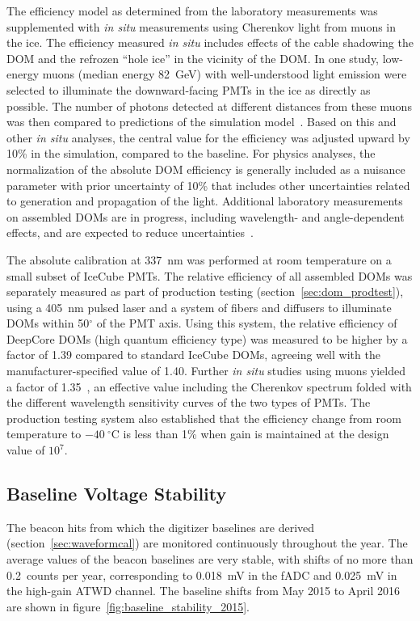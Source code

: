 The efficiency model as determined from the laboratory measurements was supplemented with \textit{in
  situ} measurements using Cherenkov light from muons in the ice. The
efficiency measured \textit{in situ} includes effects of the cable
shadowing the DOM and the refrozen ``hole ice'' in the vicinity of the
DOM. In one
study, low-energy muons (median energy 82~GeV) with well-understood light
emission were selected to illuminate the downward-facing PMTs in the ice as
directly as possible. The number of photons detected at different
distances from these muons was then compared to predictions of the
simulation model~\cite{IC3:ereco}.  Based on this and other \textit{in
  situ} analyses, the central value for the efficiency was adjusted upward
by 10\% in the simulation, compared to the baseline.  For physics analyses,
the normalization of the absolute DOM efficiency is generally included as a
nuisance parameter with prior uncertainty of 10\% that includes other uncertainties related to
generation and propagation of the light. Additional laboratory measurements
on assembled DOMs are in progress, including wavelength- and angle-dependent
effects, and are expected to reduce uncertainties~\cite{ICECUBE:DOMEFF}.

The absolute calibration at 337~nm was performed at room temperature on a
small subset of IceCube PMTs. The relative efficiency of all assembled DOMs
was separately measured as part of production testing
(section~\ref{sec:dom_prodtest}), using a 405~nm pulsed laser and a system of
fibers and diffusers to illuminate DOMs within 50$^{\circ}$ of the
PMT axis.  Using this system, the relative efficiency of DeepCore DOMs
(high quantum efficiency type) was measured to be higher by a factor
of 1.39
compared to standard IceCube DOMs, agreeing well with the
manufacturer-specified value of 1.40. Further \textit{in situ} studies
using muons yielded a factor of 1.35~\cite{ICECUBE:DC}, an
effective value including the Cherenkov spectrum folded with the different
wavelength sensitivity curves of the two types of PMTs.  The production
testing system also established that the efficiency change from room
temperature to $-40\ ^{\circ}\mathrm{C}$ is less than 1\% when gain is maintained at
the design value of $10^7$.

\subsection{\label{sec:baselines}Baseline Voltage Stability}

The beacon hits from which the digitizer baselines are derived
(section~\ref{sec:waveformcal}) are 
monitored continuously throughout the year. The average values of the
beacon baselines are very stable, with shifts of no more than
0.2~counts per year, corresponding to 0.018~mV in the fADC and
0.025~mV in the high-gain ATWD channel. The baseline shifts from May
2015 to April 2016 are shown in figure~\ref{fig:baseline_stability_2015}. 

